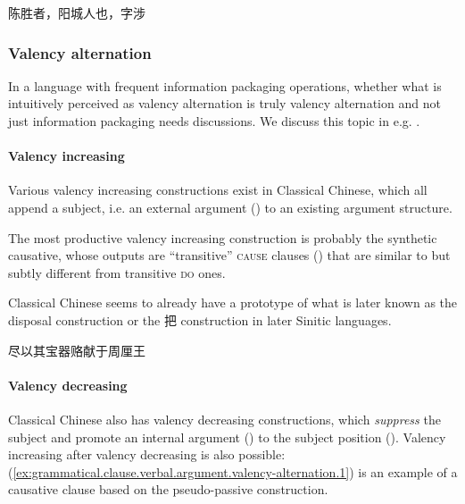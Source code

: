 \documentclass[UTF8, a4paper, oneside, scheme=plain, 12pt]{ctexrep}
\newcommand*{\category}[1]{\textsc{#1}}
\begin{document}
\begin{exe}
    \ex 陈胜者，阳城人也，字涉
\end{exe}

\subsubsection{Valency alternation}

In a language with frequent information packaging operations,
whether what is intuitively perceived as valency alternation is truly valency alternation and not just information packaging needs discussions.
We discuss this topic in e.g. .

\paragraph{Valency increasing}\label{sec:grammatical.clause.argument.alternation.increase}

Various valency increasing constructions exist in Classical Chinese,
which all append a subject, i.e. an external argument () to an existing argument structure.

The most productive valency increasing construction is probably the synthetic causative,
whose outputs are ``transitive'' \category{cause} clauses
()
that are similar to but subtly different from transitive \category{do} ones.

Classical Chinese seems to already have a prototype of what is later known as the disposal construction or the 把 construction in later Sinitic languages.

\begin{exe}
    \ex 尽以其宝器赂献于周厘王
\end{exe}

\paragraph{Valency decreasing}

Classical Chinese also has valency decreasing constructions, which \emph{suppress} the subject 
and promote an internal argument () to the subject position ().
Valency increasing after valency decreasing is also possible:
(\ref{ex:grammatical.clause.verbal.argument.valency-alternation.1})
is an example of a causative clause based on the pseudo-passive construction.
\end{document}
